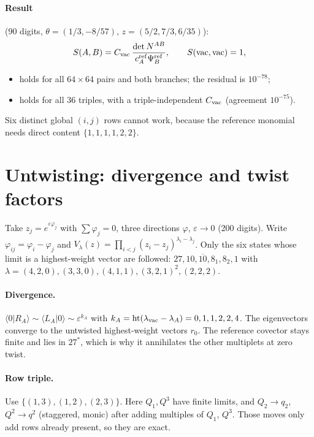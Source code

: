 \documentclass[11pt]{article}
\newcommand{\eps}{\varepsilon}
\newcommand{\vac}{{\rm vac}}
\begin{document}
\paragraph{Result} (90 digits, $\theta=(1/3,-8/57)$, $z=(5/2,7/3,6/35)$):
\begin{equation}
S(A,B)=C_\vac\,\frac{\det N^{AB}}{c^{\rm ref}_A\Psi^{\rm ref}_B},\qquad S(\vac,\vac)=1,
\end{equation}
\begin{itemize}
\item holds for all $64\times64$ pairs and both branches; the residual is $10^{-78}$;
\item holds for all 36 triples, with a triple-independent $C_\vac$ (agreement $10^{-75}$).
\end{itemize}
Six distinct global $(i,j)$ rows cannot work, because the reference monomial needs direct content $\{1,1,1,1,2,2\}$.

\section{Untwisting: divergence and twist factors}

Take $z_j=e^{\eps\varphi_j}$ with $\sum\varphi_j=0$, three directions $\varphi$, $\eps\to0$ (200 digits).
Write $\varphi_{ij}=\varphi_i-\varphi_j$ and $V_\lambda(z)=\prod_{i<j}(z_i-z_j)^{\lambda_i-\lambda_j}$.
Only the six states whose limit is a highest-weight vector are followed: $27,10,\overline{10},8_1,8_2,1$ with $\lambda=(4,2,0),(3,3,0),(4,1,1),(3,2,1)^{2},(2,2,2)$.

\paragraph{Divergence.} $\langle0|R_A\rangle\sim\langle L_A|0\rangle\sim\eps^{k_A}$ with $k_A={\rm ht}(\lambda_\vac-\lambda_A)=0,1,1,2,2,4$.
The eigenvectors converge to the untwisted highest-weight vectors $r_0$.
The reference covector stays finite and lies in $27^*$, which is why it annihilates the other multiplets at zero twist.

\paragraph{Row triple.} Use $\{(1,3),(1,2),(2,3)\}$. Here $Q_1,Q^3$ have finite limits, and $Q_2\to q_2$, $Q^2\to q^2$ (staggered, monic)
after adding multiples of $Q_1$, $Q^3$. Those moves only add rows already present, so they are exact.
\end{document}
